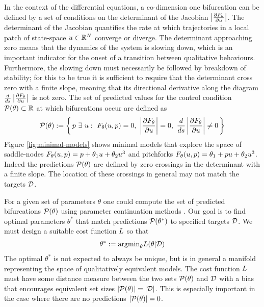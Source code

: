 In the context of the differential equations, a co-dimension one bifurcation can be defined by a set of conditions on the determinant of the Jacobian $\left| \frac{\partial F_{\theta}}{\partial u} \right|$. The determinant of the Jacobian quantifies the rate at which trajectories in a local patch of state-space $u\in\mathbb{R}^N$ converge or diverge. The determinant approaching zero means that the dynamics of the system is slowing down, which is an important indicator for the onset of a transition between qualitative behaviours. Furthermore, the slowing down must necessarily be followed by breakdown of stability; for this to be true it is sufficient to require that the determinant cross zero with a finite slope, meaning that its directional derivative along the diagram $\frac{d}{ds}\left| \frac{\partial F_{\theta}}{\partial u} \right|$ is not zero. The set of predicted values for the control condition $\mathcal{P}(\theta)\subset\mathbb{R}$ at which bifurcations occur are defined as
\begin{align}
	\mathcal{P}(\theta):=\left\{\,
	p\,\,\exists\,\,u:\,\,F_{\theta}(u,p)=0,\,\,\left| \frac{\partial F_{\theta}}{\partial u} \right|=0,
	\,\, \frac{d}{ds}\left| \frac{\partial F_{\theta}}{\partial u} \right|\neq0
	\,\right\}
	\label{eq:predictions}
\end{align}
 Figure \ref{fig:minimal-models} shows minimal models that explore the space of saddle-nodes $F_{\theta}(u,p) = p + \theta_{1}u+\theta_{2}u^3$ and pitchforks $F_{\theta}(u,p) = \theta_{1} + p u+\theta_{2}u^3$. Indeed the predictions $\mathcal{P}(\theta)$ are defined by zero crossings in the determinant with a finite slope. The location of these crossings in general may not match the targets $\mathcal{D}$.

For a given set of parameters $\theta$ one could compute the set of predicted bifurcations $\mathcal{P}(\theta)$ using parameter continuation methods \cite{Veltz2019PseudoArcLengthContinuation.jl,Farrell2016TheDiagrams}. Our goal is to find optimal parameters $\theta^*$ that match predictions $\mathcal{P}(\theta^*)$ to specified targets $\mathcal{D}$. We must design a suitable cost function $L$ so that
\begin{align}
    \theta^* := \mathrm{argmin}_{\theta} L(\theta|\mathcal{D})
    \label{eq:optimal-theta}
\end{align}
The optimal $\theta^*$ is not expected to always be unique, but is in general a manifold representing the space of qualitatively equivalent models. The cost function $L$ must have some distance measure between the two sets $\mathcal{P}(\theta)$ and $\mathcal{D}$ with a bias that encourages equivalent set sizes $|\mathcal{P}(\theta)|=|\mathcal{D}|$. This is especially important in the case where there are no predictions $|\mathcal{P}(\theta)|=0$.

